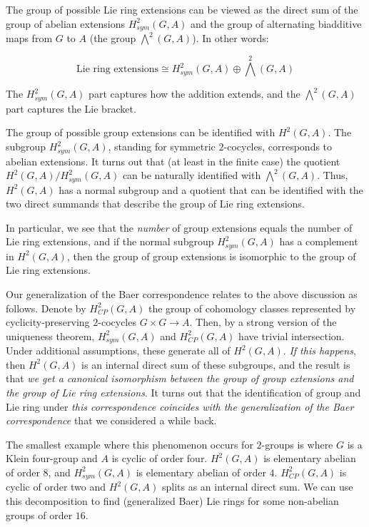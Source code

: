 \documentclass[10pt]{amsart}
\begin{document}
The group of possible Lie ring extensions can be viewed as the direct
sum of the group of abelian extensions $H^2_{sym}(G,A)$ and the group
of alternating biadditive maps from $G$ to $A$ (the group
$\bigwedge^2(G,A)$). In other words:

$$\text{Lie ring extensions} \cong H^2_{sym}(G,A) \oplus \bigwedge^2(G,A)$$

The $H^2_{sym}(G,A)$ part captures how the addition extends, and the
$\bigwedge^2(G,A)$ part captures the Lie bracket.

The group of possible group extensions can be identified with
$H^2(G,A)$. The subgroup $H^2_{sym}(G,A)$, standing for symmetric
$2$-cocycles, corresponds to abelian extensions. It turns out that (at
least in the finite case) the quotient $H^2(G,A)/H^2_{sym}(G,A)$ can
be naturally identified with $\bigwedge^2(G,A)$. Thus, $H^2(G,A)$ has
a normal subgroup and a quotient that can be identified with the two
direct summands that describe the group of Lie ring extensions.

In particular, we see that the {\em number} of group extensions equals
the number of Lie ring extensions, and if the normal subgroup
$H^2_{sym}(G,A)$ has a complement in $H^2(G,A)$, then the group of
group extensions is isomorphic to the group of Lie ring extensions.

Our generalization of the Baer correspondence relates to the above
discussion as follows. Denote by $H^2_{CP}(G,A)$ the group of
cohomology classes represented by cyclicity-preserving $2$-cocycles $G
\times G \to A$. Then, by a strong version of the uniqueness theorem,
$H^2_{sym}(G,A)$ and $H^2_{CP}(G,A)$ have trivial intersection. Under
additional assumptions, these generate all of $H^2(G,A)$. {\em If this
happens}, then $H^2(G,A)$ is an internal direct sum of these
subgroups, and the result is that {\em we get a canonical isomorphism
between the group of group extensions and the group of Lie ring
extensions}. It turns out that the identification of group and Lie
ring under {\em this correspondence coincides with the generalization
of the Baer correspondence} that we considered a while back.

The smallest example where this phenomenon occurs for $2$-groups is
where $G$ is a Klein four-group and $A$ is cyclic of order
four. $H^2(G,A)$ is elementary abelian of order $8$, and
$H^2_{sym}(G,A)$ is elementary abelian of order $4$. $H^2_{CP}(G,A)$
is cyclic of order two and $H^2(G,A)$ splits as an internal direct
sum. We can use this decomposition to find (generalized Baer) Lie
rings for some non-abelian groups of order $16$.
\end{document}
